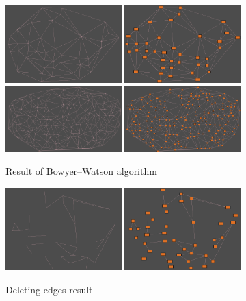 \documentclass{article}
\begin{document}
\begin{figure}
\centering
\includegraphics[width = 0.4\textwidth]{rooms deluaney triangulation just edges}
\includegraphics[width = 0.4\textwidth]{rooms deluaney triangulation}
\includegraphics[width = 0.4\textwidth]{rooms deluaney triangulation stress test}
\includegraphics[width = 0.4\textwidth]{deluaney triangulation stress test}
\caption{Result of Bowyer–Watson algorithm}
\label{bwa result}
\end{figure}

\begin{figure}
\centering
\includegraphics[width = 0.4\textwidth]{deleted edges no rooms}
\includegraphics[width = 0.4\textwidth]{deleted edges}
\caption{Deleting edges result}
\label{deleting edges result}
\end{figure}
\end{document}
